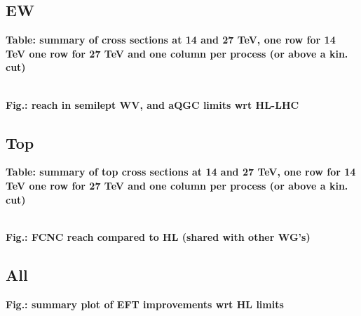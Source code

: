 \documentclass{article}
\begin{document}
\subsection{EW}

{\bf Table: summary of cross sections at 14 and 27 TeV, one row for 14 TeV one row for 27 TeV and one column per process (or above a kin. cut) }



\\
{\bf Fig.: reach in semilept WV, and aQGC limits wrt HL-LHC}



\subsection{Top}

{\bf Table: summary of top cross sections at 14 and 27 TeV, one row for 14 TeV one row for 27 TeV and one column per process (or above a kin. cut) }



\\
{\bf Fig.: FCNC reach compared to HL (shared with other WG's)}


\subsection{All}

{\bf Fig.: summary plot of EFT improvements wrt HL limits}


{}
\end{document}
